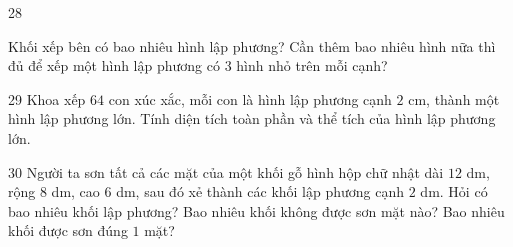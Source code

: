 \gap
\begin{probbox}{28}{\relax}
\begin{minipage}[t]{0.6\linewidth}
Khối xếp bên có bao nhiêu hình lập phương? Cần thêm bao nhiêu hình nữa thì đủ để xếp một hình lập phương có $3$ hình nhỏ trên mỗi cạnh?
\end{minipage}\hfill
\begin{minipage}[t]{0.36\linewidth}\vspace{0pt}\centering
{}
\end{minipage}
\end{probbox}
\gap
\begin{probbox}{29}{\relax}
Khoa xếp $64$ con xúc xắc, mỗi con là hình lập phương cạnh $2$ cm, thành một hình lập phương lớn. Tính diện tích toàn phần và thể tích của hình lập phương lớn.
\end{probbox}
\gap
\begin{probbox}{30}{\relax}
Người ta sơn tất cả các mặt của một khối gỗ hình hộp chữ nhật dài $12$ dm, rộng $8$ dm, cao $6$ dm, sau đó xẻ thành các khối lập phương cạnh $2$ dm. Hỏi có bao nhiêu khối lập phương? Bao nhiêu khối không được sơn mặt nào? Bao nhiêu khối được sơn đúng $1$ mặt?
\end{probbox}
